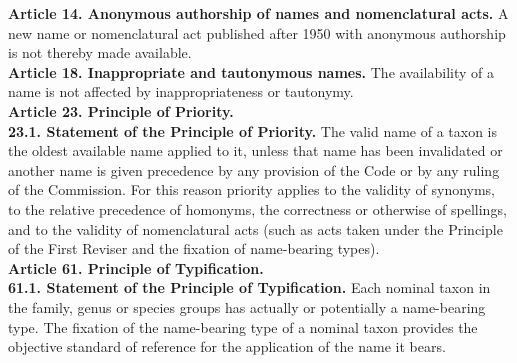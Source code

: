 \documentclass[letterpaper, 11pt]{article}
\begin{document}
\noindent{}\textbf{Article 14. Anonymous authorship of names and nomenclatural acts.} A new name or nomenclatural act published after 1950 with anonymous authorship is not thereby made available.\\

\noindent{}\textbf{Article 18. Inappropriate and tautonymous names.} The availability of a name is not affected by inappropriateness or tautonymy.\\

\noindent{}\textbf{Article 23. Principle of Priority.}\\
\noindent{}\textbf{23.1. Statement of the Principle of Priority.} The valid name of a taxon is the oldest available name applied to it, unless that name has been invalidated or another name is given precedence by any provision of the Code or by any ruling of the Commission. For this reason priority applies to the validity of synonyms, to the relative precedence of homonyms, the correctness or otherwise of spellings, and to the validity of nomenclatural acts (such as acts taken under the Principle of the First Reviser and the fixation of name-bearing types).\\

\noindent{}\textbf{Article 61. Principle of Typification.}\\
\noindent{}\textbf{61.1. Statement of the Principle of Typification.} Each nominal taxon in the family, genus or species groups has actually or potentially a name-bearing type. The fixation of the name-bearing type of a nominal taxon provides the objective standard of reference for the application of the name it bears.
\end{document}
